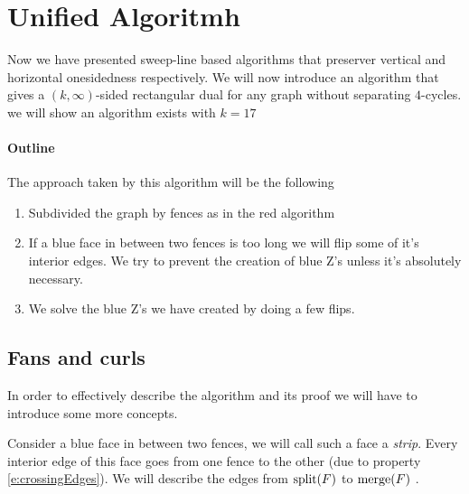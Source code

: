 
\newenvironment{invariants}{%
  \refstepcounter{thrm}%
  \paragraph{Invariants~\theprop}%
  \renewcommand*{\theenumi}{\theprop\,(I\arabic{enumi})}%
  \renewcommand*{\labelenumi}{(I\arabic{enumi})}%
  \enumerate
}{%
  \endenumerate
}

\section{Unified Algoritmh}

Now we have presented sweep-line based algorithms that preserver vertical and horizontal onesidedness respectively. We will now introduce an algorithm that gives a $(k,\infty)$-sided rectangular dual for any graph without separating $4$-cycles. we will show an algorithm exists with $k=17$

\paragraph{Outline}
The approach taken by this algorithm will be the following
\begin{enumerate}
  \item Subdivided the graph by fences as in the red algorithm
  \item If a blue face in between two fences is too long we will flip some of it's interior edges. We try to prevent the creation of blue Z's unless it's absolutely necessary.
  \item We solve the blue Z's we have created by doing a few flips.
\end{enumerate}


 \subsection{Fans and curls}
 In order to effectively describe the algorithm and its proof we will have to introduce some more concepts.

 Consider a blue face in between two fences, we will call such a face a \emph{strip}. Every interior edge of this face goes from one fence to the other (due to property \ref{e:crossingEdges}). We will describe the edges from $\operatorname{split}(F)$ to $\operatorname{merge}(F)$ .

